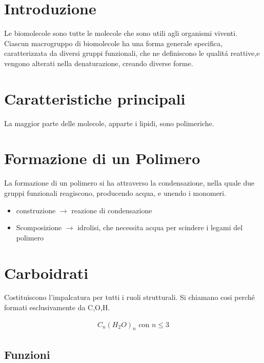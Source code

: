 \documentclass{article}
\title{\jobname}
\author{Eugenio Animali}
\begin{document}
\maketitle
\section{Introduzione}

Le biomolecole sono tutte le molecole che sono utili agli organismi viventi. Ciascun macrogruppo di biomolecole ha una forma generale specifica, caratterizzata da diversi gruppi funzionali, che ne definiscono le qualitá reattive,e vengono alterati nella denaturazione, creando diverse forme.

\section{Caratteristiche principali}

La maggior parte delle molecole, apparte i lipidi, sono polimeriche.

\section{Formazione di un Polimero}

La formazione di un polimero si ha attraverso la condensazione, nella quale due gruppi funzionali reagiscono, producendo acqua, e unendo i monomeri.

\begin{itemize}
\item construzione $\to$ reazione di condensazione
\item Scomposizione $\to$ idrolisi, che necessita acqua per scindere i legami del polimero
\end{itemize}

\section{Carboidrati}

Costituiscono l'impalcatura per tutti i ruoli strutturali. Si chiamano cosi perché formati esclusivamente da C,O,H.

\begin{gather*}
C_n(H_2O)_n\text{ con $n\leq 3$}
\end{gather*}

\subsection{Funzioni}
\end{document}
